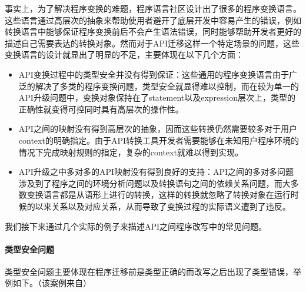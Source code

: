 事实上，为了解决程序变换的难题，程序语言社区设计出了很多的程序变换语言\cite{twinning}\cite{stratego}\cite{txl}。这些语言通过高层次的抽象来帮助使用者避开了底层开发中容易产生的错误，例如转换语言中能够保证程序变换前后不会产生语法错误，同时能够帮助开发者更好的描述自己需要表达的转换对象。然而对于API迁移这样一个特定场景的问题，这些变换语言的设计就显出了明显的不足，主要体现在以下几个方面：
\begin{itemize}
\item API变换过程中的类型安全并没有得到保证：这些通用的程序变换语言由于广泛的解决了多类的程序变换问题，类型安全就显得难以控制，而在较为单一的API升级问题中，变换对象保持在了statement以及expression层次上，类型的正确性就变得可控同时具有高层次的操作性。
\item API之间的映射没有得到高层次的抽象，因而这些转换仍然需要较多对于用户context的明确指定。由于API转换工具开发者需要能够在未知用户程序环境的情况下完成映射规则的指定，复杂的context就难以得到实现。
\item API升级之中多对多的API映射没有得到良好的支持：API之间的多对多问题涉及到了程序之间的环境分析问题以及转换语句之间的依赖关系问题，而大多数变换语言都是从语形上进行的转换，这样的转换就忽略了转换对象在运行时候的以来关系以及对应关系，从而导致了变换过程的实际语义遭到了违反。
\end{itemize}

我们接下来通过几个实际的例子来描述API之间程序改写中的常见问题。
\paragraph{类型安全问题} 类型安全问题主要体现在程序迁移前是类型正确的而改写之后出现了类型错误，举例如下。（该案例来自\cite{swing2swt}）

